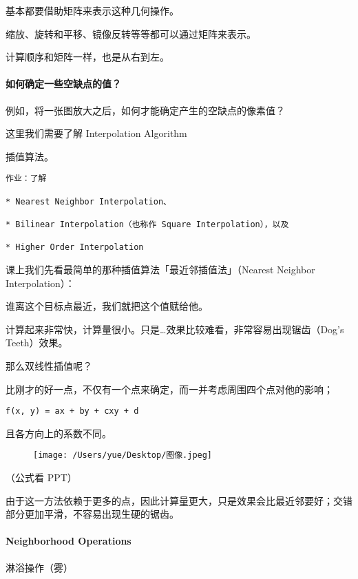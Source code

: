 \documentclass[
]{article}
\begin{document}
基本都要借助矩阵来表示这种几何操作。

缩放、旋转和平移、镜像反转等等都可以通过矩阵来表示。

计算顺序和矩阵一样，也是从右到左。

\hypertarget{header-n73}{%
\paragraph{如何确定一些空缺点的值？}\label{header-n73}}

例如，将一张图放大之后，如何才能确定产生的空缺点的像素值？

这里我们需要了解 Interpolation Algorithm

插值算法。

\begin{verbatim}
作业：了解

* Nearest Neighbor Interpolation、

* Bilinear Interpolation（也称作 Square Interpolation），以及

* Higher Order Interpolation
\end{verbatim}

课上我们先看最简单的那种插值算法「最近邻插值法」（Nearest Neighbor
Interpolation）：

谁离这个目标点最近，我们就把这个值赋给他。

计算起来非常快，计算量很小。只是\ldots 效果比较难看，非常容易出现锯齿（Dog's
Teeth）效果。

那么双线性插值呢？

比刚才的好一点，不仅有一个点来确定，而一并考虑周围四个点对他的影响；

\texttt{f(x,\ y)\ =\ ax\ +\ by\ +\ cxy\ +\ d}

且各方向上的系数不同。

\begin{figure}
\centering
\texttt{[image: /Users/yue/Desktop/图像.jpeg]}
\caption{}
\end{figure}

（公式看 PPT）

由于这一方法依赖于更多的点，因此计算量更大，只是效果会比最近邻要好；交错部分更加平滑，不容易出现生硬的锯齿。

\hypertarget{header-n88}{%
\paragraph{Neighborhood Operations}\label{header-n88}}

淋浴操作（雾）
\end{document}
